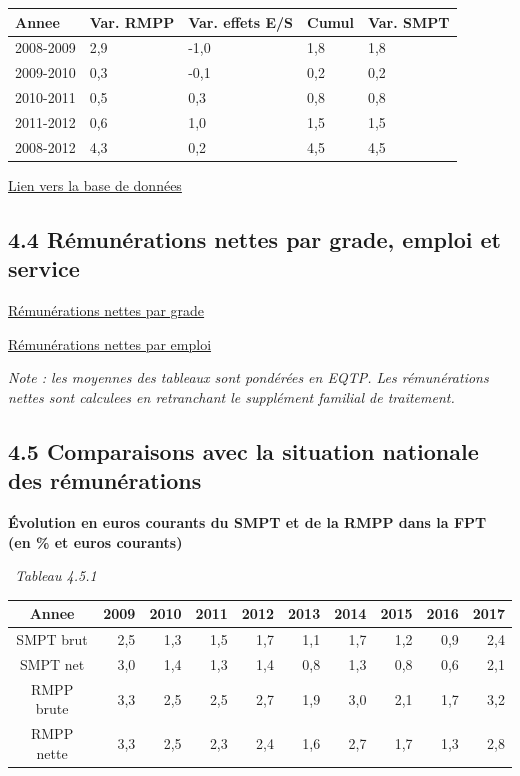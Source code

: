 \begin{longtable}[]{@{}lllll@{}}
\toprule
Annee & Var. RMPP & Var. effets E/S & Cumul & Var. SMPT\tabularnewline
\midrule
\endhead
2008-2009 & 2,9 & -1,0 & 1,8 & 1,8\tabularnewline
2009-2010 & 0,3 & -0,1 & 0,2 & 0,2\tabularnewline
2010-2011 & 0,5 & 0,3 & 0,8 & 0,8\tabularnewline
2011-2012 & 0,6 & 1,0 & 1,5 & 1,5\tabularnewline
2008-2012 & 4,3 & 0,2 & 4,5 & 4,5\tabularnewline
\bottomrule
\end{longtable}

\href{../Bases/Remunerations/Anavar.synthese.csv}{Lien vers la base de
données}

\hypertarget{remunerations-nettes-par-grade-emploi-et-service}{%
\subsection{4.4 Rémunérations nettes par grade, emploi et
service}\label{remunerations-nettes-par-grade-emploi-et-service}}

\href{../Bases/Remunerations/net.grades.csv}{Rémunérations nettes par
grade}

\href{../Bases/Remunerations/net.emplois.csv}{Rémunérations nettes par
emploi}

\emph{Note : les moyennes des tableaux sont pondérées en EQTP. Les
rémunérations nettes sont calculees en retranchant le supplément
familial de traitement.}

\hypertarget{comparaisons-avec-la-situation-nationale-des-remunerations}{%
\subsection{4.5 Comparaisons avec la situation nationale des
rémunérations}\label{comparaisons-avec-la-situation-nationale-des-remunerations}}

\textbf{Évolution en euros courants du SMPT et de la RMPP dans la FPT
(en \% et euros courants)}

~\emph{Tableau 4.5.1}

\begin{longtable}[]{@{}crrrrrrrrr@{}}
\toprule
Annee & 2009 & 2010 & 2011 & 2012 & 2013 & 2014 & 2015 & 2016 &
2017\tabularnewline
\midrule
\endhead
SMPT brut & 2,5 & 1,3 & 1,5 & 1,7 & 1,1 & 1,7 & 1,2 & 0,9 &
2,4\tabularnewline
SMPT net & 3,0 & 1,4 & 1,3 & 1,4 & 0,8 & 1,3 & 0,8 & 0,6 &
2,1\tabularnewline
RMPP brute & 3,3 & 2,5 & 2,5 & 2,7 & 1,9 & 3,0 & 2,1 & 1,7 &
3,2\tabularnewline
RMPP nette & 3,3 & 2,5 & 2,3 & 2,4 & 1,6 & 2,7 & 1,7 & 1,3 &
2,8\tabularnewline
\bottomrule
\end{longtable}

